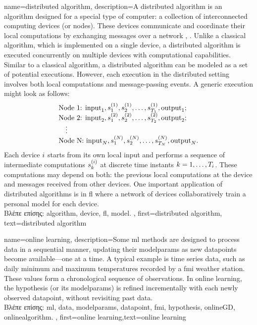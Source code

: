 {name={distributed algorithm},
	description={A distributed \gls{algorithm} is an \gls{algorithm} designed for 
		a special type of computer: a collection of interconnected computing devices (or nodes). 
		These devices communicate and coordinate their local computations by exchanging 
		messages over a network \cite{IntroDistAlg}, \cite{ParallelDistrBook}. Unlike a classical \gls{algorithm}, 
		which is implemented on a single \gls{device}, a distributed \gls{algorithm} is 
		executed concurrently on multiple \gls{device}s with computational capabilities. 
		Similar to a classical \gls{algorithm}, a distributed \gls{algorithm} can be modeled as a 
		set of potential executions. However, each execution in the distributed setting involves 
		both local computations and message-passing events. A generic execution might look as 
		follows:
		\[
		\begin{array}{l}
			\text{Node 1: } {\rm input}_1, s_1^{(1)}, s_2^{(1)}, \ldots, s_{T_1}^{(1)}, {\rm output}_1; \\
			\text{Node 2: } {\rm input}_2, s_1^{(2)}, s_2^{(2)}, \ldots, s_{T_2}^{(2)}, {\rm output}_2; \\
			\quad \vdots \\
			\text{Node N: } {\rm input}_N, s_1^{(N)}, s_2^{(N)}, \ldots, s_{T_N}^{(N)}, {\rm output}_N.
		\end{array}
		\]
		Each \gls{device} $i$ starts from its own local input and performs a sequence of 
		intermediate computations $s_{k}^{(i)}$ at discrete time instants $k = 1, \dots, T_i$. 
		These computations may depend on both: the previous local computations at the \gls{device} 
		and messages received from other \gls{device}s. One important application of distributed 
		\gls{algorithm}s is in \gls{fl} where a network of \gls{device}s collaboratively train a personal \gls{model} 
		for each \gls{device}.\\
		\foreignlanguage{greek}{Βλέπε επίσης:} \gls{algorithm}, \gls{device}, \gls{fl}, \gls{model}.
		},
	first={distributed algorithm}, text={distributed algorithm}
}

{name={online learning},
	description={Some \gls{ml} methods  are designed to process \gls{data} in a sequential 
		manner, updating their \gls{modelparams} as new \gls{datapoint}s become available—one at a time. 
		A typical example is time series data, such as daily \gls{minimum} and \gls{maximum} temperatures 
		recorded by a \gls{fmi} weather station. These values form a chronological sequence 
		of observations. In online learning, the \gls{hypothesis} (or its \gls{modelparams}) is refined 
		incrementally with each newly observed \gls{datapoint}, without revisiting past \gls{data}.  \\ 
		\foreignlanguage{greek}{Βλέπε επίσης:} \gls{ml}, \gls{data}, \gls{modelparams}, \gls{datapoint}, \gls{fmi}, \gls{hypothesis}, \gls{onlineGD}, \gls{onlinealgorithm}.  
	},
	first={online learning},text={online learning} 
}

